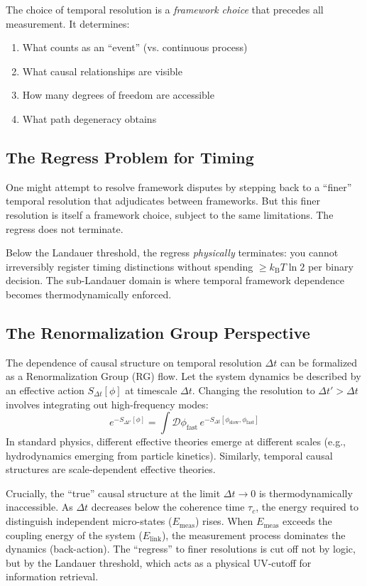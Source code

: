 \documentclass[12pt]{article}
\numberwithin{equation}{section}
\newcommand{\kB}{k_{\mathrm{B}}}
\begin{document}
The choice of temporal resolution is a \emph{framework choice} that precedes all measurement. It determines:
\begin{enumerate}
\item What counts as an ``event'' (vs. continuous process)
\item What causal relationships are visible
\item How many degrees of freedom are accessible
\item What path degeneracy obtains
\end{enumerate}

\subsection{The Regress Problem for Timing}

One might attempt to resolve framework disputes by stepping back to a ``finer'' temporal resolution that adjudicates between frameworks. But this finer resolution is itself a framework choice, subject to the same limitations. The regress does not terminate.

Below the Landauer threshold, the regress \emph{physically} terminates: you cannot irreversibly register timing distinctions without spending $\ge \kB T\ln 2$ per binary decision. The sub-Landauer domain is where temporal framework dependence becomes thermodynamically enforced.

\subsection{The Renormalization Group Perspective}

The dependence of causal structure on temporal resolution $\Delta t$ can be formalized as a Renormalization Group (RG) flow. Let the system dynamics be described by an effective action $S_{\Delta t}[\phi]$ at timescale $\Delta t$. Changing the resolution to $\Delta t' > \Delta t$ involves integrating out high-frequency modes:
\begin{equation}
e^{-S_{\Delta t'}[\phi]} = \int \mathcal{D}\phi_{\text{fast}} \, e^{-S_{\Delta t}[\phi_{\text{slow}}, \phi_{\text{fast}}]}
\end{equation}
In standard physics, different effective theories emerge at different scales (e.g., hydrodynamics emerging from particle kinetics). Similarly, temporal causal structures are scale-dependent effective theories.

Crucially, the ``true'' causal structure at the limit $\Delta t \to 0$ is thermodynamically inaccessible. As $\Delta t$ decreases below the coherence time $\tau_c$, the energy required to distinguish independent micro-states ($E_{\text{meas}}$) rises. When $E_{\text{meas}}$ exceeds the coupling energy of the system ($E_{\text{link}}$), the measurement process dominates the dynamics (back-action). The ``regress'' to finer resolutions is cut off not by logic, but by the Landauer threshold, which acts as a physical UV-cutoff for information retrieval.
\end{document}
